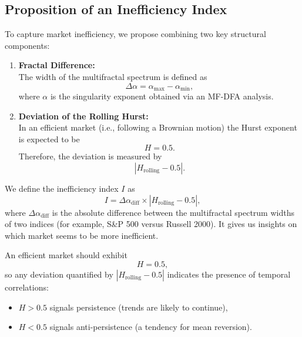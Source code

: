 \documentclass[11pt]{extarticle}
\begin{document}
\subsection{Proposition of an Inefficiency Index}

To capture market inefficiency, we propose combining two key structural components:

\begin{enumerate}
    \item \textbf{Fractal Difference:}\\[1ex]
    The width of the multifractal spectrum is defined as
    \begin{equation}
    \Delta \alpha = \alpha_{\text{max}} - \alpha_{\text{min}},
    \end{equation}
    where $\alpha$ is the singularity exponent obtained via an MF-DFA analysis.

    \item \textbf{Deviation of the Rolling Hurst:}\\[1ex]
    In an efficient market (i.e., following a Brownian motion) the Hurst exponent is expected to be
    \begin{equation}
    H = 0.5.
    \end{equation}
    Therefore, the deviation is measured by
    \begin{equation}
    \left|H_{\text{rolling}} - 0.5\right|.
    \end{equation}
\end{enumerate}

We define the inefficiency index $I$ as
\begin{equation}
I = \Delta\alpha_{\text{diff}} \times \left|H_{\text{rolling}} - 0.5\right|,
\end{equation}
where $\Delta\alpha_{\text{diff}}$ is the absolute difference between the multifractal spectrum widths of two indices (for example, S\&P 500 versus Russell 2000).
It gives us insights on which market seems to be more inefficient.


An efficient market should exhibit
\begin{equation}
H = 0.5,
\end{equation}
so any deviation quantified by $\left|H_{\text{rolling}} - 0.5\right|$ indicates the presence of temporal correlations:
\begin{itemize}
    \item $H>0.5$ signals persistence (trends are likely to continue),
    \item $H<0.5$ signals anti-persistence (a tendency for mean reversion).
\end{itemize}
\end{document}
